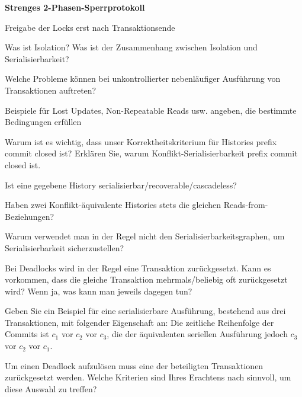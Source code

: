 \textbf{Strenges 2-Phasen-Sperrprotokoll}
\begin{items}
	\item Freigabe der Locks erst nach Transaktionsende
\end{items}

\begin{fragen}
	\begin{enumeration}
		\item Was ist Isolation? Was ist der Zusammenhang zwischen Isolation und Serialisierbarkeit?
		\item Welche Probleme können bei unkontrollierter nebenläufiger Ausführung von Transaktionen auftreten?
		\item Beispiele für Lost Updates, Non-Repeatable Reads usw. angeben, die bestimmte Bedingungen erfüllen
		\item Warum ist es wichtig, dass unser Korrektheitskriterium für Histories prefix commit closed ist? Erklären Sie, warum Konflikt-Serialisierbarkeit prefix commit closed ist.
		\item Ist eine gegebene History serialisierbar/recoverable/cascadeless?
		\item Haben zwei Konflikt-äquivalente Histories stets die gleichen Reads-from-Beziehungen?
		\item Warum verwendet man in der Regel nicht den Serialisierbarkeitsgraphen, um Serialisierbarkeit sicherzustellen?
		\item Bei Deadlocks wird in der Regel eine Transaktion zurückgesetzt. Kann es vorkommen, dass die gleiche Transaktion mehrmals/beliebig oft zurückgesetzt wird? Wenn ja, was kann man jeweils dagegen tun?
		\item Geben Sie ein Beispiel für eine serialisierbare Ausführung, bestehend aus drei Transaktionen, mit folgender Eigenschaft an: Die zeitliche Reihenfolge der Commits ist \( c_1 \) vor \( c_2 \) vor \( c_3 \), die der äquivalenten seriellen Ausführung jedoch \( c_3 \) vor \( c_2 \) vor \( c_1 \).
		\item Um einen Deadlock aufzulösen muss eine der beteiligten Transaktionen zurückgesetzt werden. Welche Kriterien sind Ihres Erachtens nach sinnvoll, um diese Auswahl zu treffen?
	\end{enumeration}
\end{fragen}